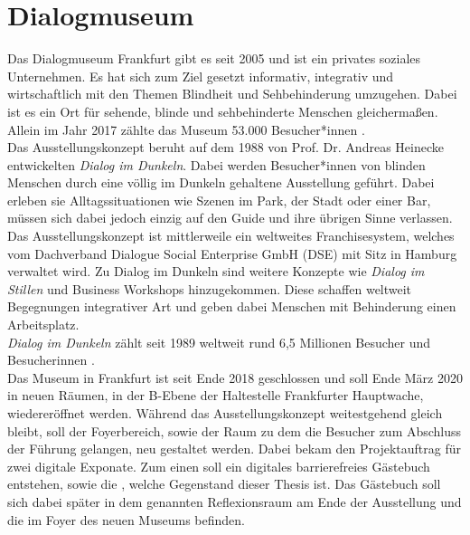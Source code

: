 \section{Dialogmuseum}
\label{sec:dialogmuseum}

Das Dialogmuseum Frankfurt \cite{dialogmuseum} gibt es seit 2005 und ist ein privates soziales 
Unternehmen. Es hat sich zum Ziel gesetzt informativ, integrativ und wirtschaftlich mit 
den Themen Blindheit und Sehbehinderung umzugehen. Dabei ist es ein Ort für sehende, 
blinde und sehbehinderte Menschen gleichermaßen. Allein im Jahr 2017 zählte das Museum 53.000 
Besucher*innen \cite{besucher}.\\

Das Ausstellungskonzept beruht auf dem 1988 von Prof. Dr. Andreas Heinecke entwickelten
\emph{Dialog im Dunkeln}. Dabei werden Besucher*innen von blinden Menschen durch eine 
völlig im Dunkeln gehaltene Ausstellung geführt. Dabei erleben sie Alltagssituationen
wie Szenen im Park, der Stadt oder einer Bar, müssen sich dabei jedoch einzig auf
den Guide und ihre übrigen Sinne verlassen.\\

Das Ausstellungskonzept ist mittlerweile ein weltweites Franchisesystem, welches vom 
Dachverband Dialogue Social Enterprise GmbH (DSE) \cite{dachverband} mit Sitz in Hamburg verwaltet wird.
Zu Dialog im Dunkeln sind weitere Konzepte wie \emph{Dialog im Stillen} und Business Workshops
hinzugekommen. Diese schaffen weltweit Begegnungen integrativer Art und geben dabei 
Menschen mit Behinderung einen Arbeitsplatz.\\
\emph{Dialog im Dunkeln} zählt seit 1989 weltweit rund 6,5 Millionen Besucher und Besucherinnen
\cite{weltweit}.\\

Das Museum in Frankfurt ist seit Ende 2018 geschlossen und soll Ende März 2020 in neuen Räumen, in der B-Ebene
der Haltestelle Frankfurter Hauptwache, wiedereröffnet werden. Während das Ausstellungskonzept
weitestgehend gleich bleibt, soll der Foyerbereich, sowie der Raum zu dem die Besucher zum Abschluss
der Führung gelangen, neu gestaltet werden. Dabei bekam \meso{} den Projektauftrag für zwei
digitale Exponate. Zum einen soll ein digitales barrierefreies Gästebuch entstehen, sowie die
\shst{}, welche Gegenstand dieser Thesis ist. Das Gästebuch soll sich dabei später in dem 
genannten Reflexionsraum am Ende der Ausstellung und die \shst{} im Foyer des neuen Museums befinden.
